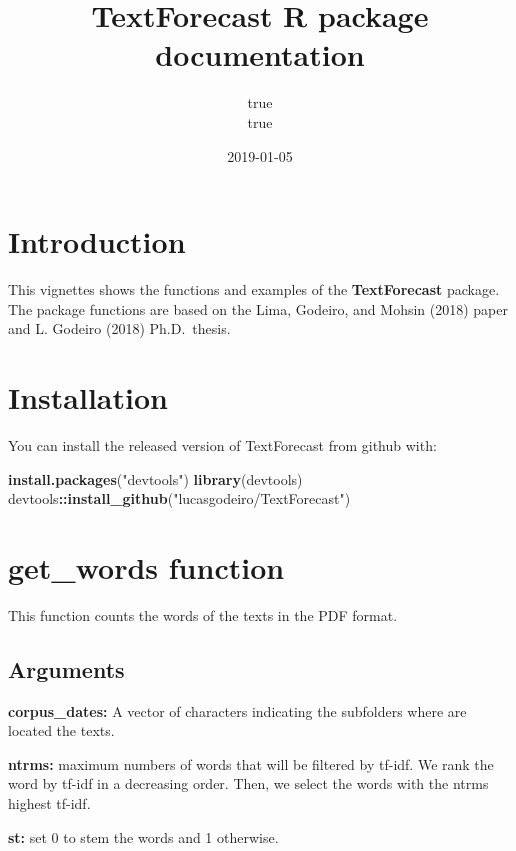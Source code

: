 \documentclass[]{article}
\title{TextForecast R package documentation}
\author{true \\ true}
\date{2019-01-05}
\newenvironment{Shaded}{\begin{snugshade}}{\end{snugshade}}
\newcommand{\KeywordTok}[1]{\textcolor[rgb]{0.13,0.29,0.53}{\textbf{#1}}}
\newcommand{\StringTok}[1]{\textcolor[rgb]{0.31,0.60,0.02}{#1}}
\newcommand{\OperatorTok}[1]{\textcolor[rgb]{0.81,0.36,0.00}{\textbf{#1}}}
\newcommand{\NormalTok}[1]{#1}
\begin{document}
\maketitle

{
\setcounter{tocdepth}{2}
\tableofcontents
}
\section{Introduction}\label{introduction}

This vignettes shows the functions and examples of the
\textbf{TextForecast} package. The package functions are based on the
Lima, Godeiro, and Mohsin (2018) paper and L. Godeiro (2018)
Ph.D.~thesis.

\section{Installation}\label{installation}

You can install the released version of TextForecast from github with:

\begin{Shaded}
\begin{Highlighting}[]
\KeywordTok{install.packages}\NormalTok{(}\StringTok{"devtools"}\NormalTok{)}
\KeywordTok{library}\NormalTok{(devtools)}
\NormalTok{devtools}\OperatorTok{::}\KeywordTok{install_github}\NormalTok{(}\StringTok{"lucasgodeiro/TextForecast"}\NormalTok{)}
\end{Highlighting}
\end{Shaded}

\section{get\_words function}\label{get_words-function}

This function counts the words of the texts in the PDF format.

\subsection{Arguments}\label{arguments}

\textbf{corpus\_dates:} A vector of characters indicating the subfolders
where are located the texts.

\textbf{ntrms:} maximum numbers of words that will be filtered by
tf-idf. We rank the word by tf-idf in a decreasing order. Then, we
select the words with the ntrms highest tf-idf.

\textbf{st:} set 0 to stem the words and 1 otherwise.
\end{document}
